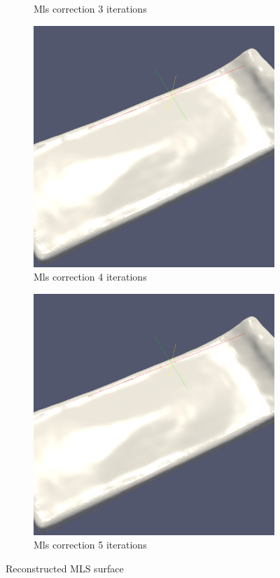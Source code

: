\begin{figure}
\begin{center}
\begin{subfigure}[b]{0.47\textwidth}
			\caption{Mls correction 3 iterations}
		\end{subfigure}
		\begin{subfigure}[b]{0.47\textwidth}
			\includegraphics[width=\textwidth]{figures/Mls2Surface4Iteration.png}
			\caption{Mls correction 4 iterations}
		\end{subfigure}
		\begin{subfigure}[b]{0.47\textwidth}
			\includegraphics[width=\textwidth]{figures/Mls2Surface5Iteration.png}
			\caption{Mls correction 5 iterations}
		\end{subfigure}
	\end{center}
	\caption{Reconstructed MLS surface} 
	\label{fig:mls_surf_iter_examples2}
\end{figure}

